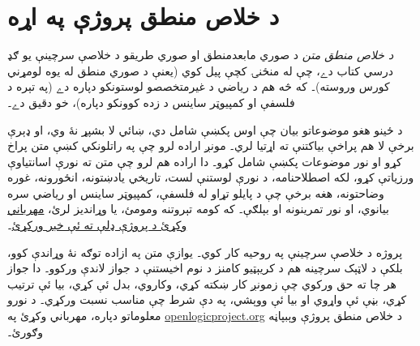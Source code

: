 \chapter*{د خلاص منطق پروژې په اړه}


\textit{د خلاص منطق متن} د صوري مابعدمنطق او صوري طريقو د خلاصې سرچينې يو ګډ درسي کتاب دے، چې له منځنۍ کچې پيل کوي (يعنې د صوري منطق له يوه لومړني کورس وروسته)۔ که څه هم د رياضي د غيرمتخصصو لوستونکو دپاره دے (په تېره د فلسفې او کمپيوټر ساينس د زده کوونکو دپاره)، خو دقيق دے۔

د ځينو هغو موضوعاتو بيان چې اوس پکښې شامل دي، ښائي لا بشپړ نۀ وي، او ډېرې برخې لا هم پراخې بياکتنې ته اړتيا لري۔ مونږ اراده لرو چې په راتلونکي کښې متن پراخ کړو او نور موضوعات پکښې شامل کړو۔ دا اراده هم لرو چې متن ته نورې اسانتياوې ورزياتې کړو، لکه اصطلاحنامه، د نورې لوستنې لست، تاريخي يادښتونه، انځورونه، غوره وضاحتونه، هغه برخې چې د پايلو تړاو له فلسفې، کمپيوټر ساينس او رياضي سره بيانوي، او نور تمرينونه او بېلګې۔ که کومه تېروتنه ومومئ، يا وړانديز لرئ، \href{https://github.com/OpenLogicProject/OpenLogic/wiki/Contributing}{مهرباني وکړئ د پروژې ډلې ته ئې خبر ورکړئ}۔

پروژه د خلاصې سرچينې په روحيه کار کوي۔ يوازې متن په ازاده توګه نۀ وړاندې کوو، بلکې د لاټېک سرچينه هم د کريېټيو کامنز د نوم اخيستنې د جواز لاندې ورکوو۔ دا جواز هر چا ته حق ورکوي چې زمونږ کار ښکته کړي، وکاروي، بدل ئې کړي، بيا ئې ترتيب کړي، بڼې ئې واړوي او بيا ئې ووېشي، په دې شرط چې مناسب نسبت ورکړي۔ د نورو معلوماتو دپاره، مهرباني وکړئ په \href{http://openlogicproject.org/}{openlogicproject.org} د خلاص منطق پروژې وېبپاڼه وګورئ۔
